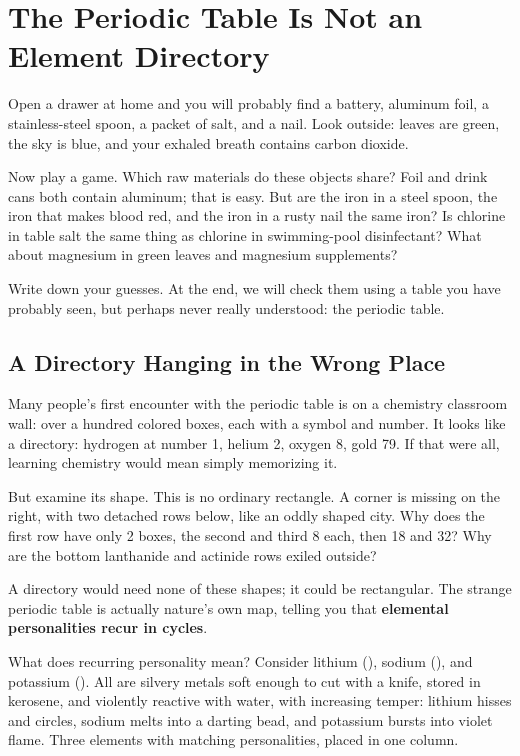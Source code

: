 \chapter{The Periodic Table Is Not an Element Directory}

\begin{kaichang}
Open a drawer at home and you will probably find a battery, aluminum foil, a stainless-steel spoon, a packet of salt, and a nail. Look outside: leaves are green, the sky is blue, and your exhaled breath contains carbon dioxide.

Now play a game. Which raw materials do these objects share? Foil and drink cans both contain aluminum; that is easy. But are the iron in a steel spoon, the iron that makes blood red, and the iron in a rusty nail the same iron? Is chlorine in table salt the same thing as chlorine in swimming-pool disinfectant? What about magnesium in green leaves and magnesium supplements?

Write down your guesses. At the end, we will check them using a table you have probably seen, but perhaps never really understood: the periodic table.
\end{kaichang}

\section{A Directory Hanging in the Wrong Place}

Many people's first encounter with the periodic table is on a chemistry classroom wall: over a hundred colored boxes, each with a symbol and number. It looks like a directory: hydrogen at number 1, helium 2, oxygen 8, gold 79. If that were all, learning chemistry would mean simply memorizing it.

But examine its shape. This is no ordinary rectangle. A corner is missing on the right, with two detached rows below, like an oddly shaped city. Why does the first row have only 2 boxes, the second and third 8 each, then 18 and 32? Why are the bottom lanthanide and actinide rows exiled outside?

A directory would need none of these shapes; it could be rectangular. The strange periodic table is actually nature's own map, telling you that \textbf{elemental personalities recur in cycles}.

What does recurring personality mean? Consider lithium (), sodium (), and potassium (). All are silvery metals soft enough to cut with a knife, stored in kerosene, and violently reactive with water, with increasing temper: lithium hisses and circles, sodium melts into a darting bead, and potassium bursts into violet flame. Three elements with matching personalities, placed in one column.

